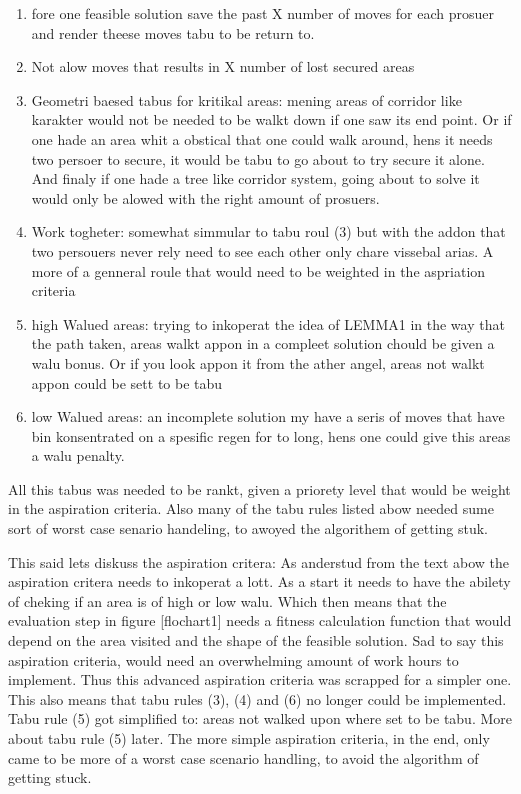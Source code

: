 \begin{enumerate}

\item fore one feasible solution save the past X number of moves for each prosuer and render theese moves tabu to be return to.


\item Not alow moves that results in X number of lost secured areas

\item Geometri baesed tabus for kritikal areas:
\subitem mening areas of corridor like karakter would not be needed to be walkt down if one saw its end point. Or if one hade an area whit a obstical that one could walk around, hens it needs two persoer to secure,  it would be tabu to go about to try secure it alone. And finaly if one hade a tree like corridor system, going about to solve it would only be alowed with the right amount of prosuers.

\item Work togheter:
\subitem somewhat simmular to tabu roul (3) but with the addon that two persouers never rely need to see each other only chare vissebal arias. A more of a genneral roule that would need to be weighted in the aspriation criteria

\item high Walued areas:
\subitem trying to inkoperat the idea of  LEMMA1 in the way that the path taken, areas walkt appon in a compleet solution chould be given a walu bonus. Or if you look appon it from the ather angel, areas not walkt appon could be sett to be tabu 

\item low Walued areas:
\subitem an incomplete solution my have a seris of moves that have bin konsentrated on a spesific regen for to long, hens one could give this areas a walu penalty.

\end{enumerate}

All this tabus was needed to be rankt, given a priorety level that would be weight in the aspiration criteria. Also many of the tabu rules listed abow needed sume sort of worst case senario handeling, to awoyed the algorithem of getting stuk.

This said lets diskuss the aspiration critera:
As anderstud from the text abow the aspiration critera needs to inkoperat a lott. As a start it needs to have the abilety of cheking if an area is of high or low walu. Which then means that the evaluation step in figure [flochart1] needs a fitness calculation function that would depend on the area visited and the shape of the feasible solution.
Sad to say this aspiration criteria, would need an overwhelming amount of work hours to implement. Thus this advanced aspiration criteria was scrapped for a simpler one. This also means that tabu rules (3), (4) and (6) no longer could be implemented. Tabu rule (5) got simplified to: areas not walked upon where set to be tabu. More about tabu rule (5) later.
The more simple aspiration criteria, in the end, only came to be more of a worst case scenario handling, to avoid the algorithm of getting stuck.

